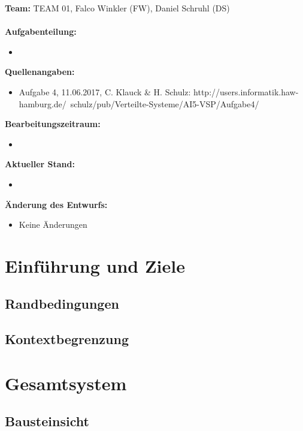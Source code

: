 \documentclass{article}
\begin{document}
\textbf{Team:} TEAM 01, Falco Winkler (FW), Daniel Schruhl (DS)\\
\\
\textbf{Aufgabenteilung:}
\begin{itemize}
    \item
\end{itemize}

\textbf{Quellenangaben:}
\begin{itemize}
    \item Aufgabe 4, 11.06.2017, C. Klauck \& H. Schulz: \newline
    http://users.informatik.haw-hamburg.de/~schulz/pub/Verteilte-Systeme/AI5-VSP/Aufgabe4/
\end{itemize}

\textbf{Bearbeitungszeitraum:}
\begin{itemize}
	\item
\end{itemize}

\textbf{Aktueller Stand:}
\begin{itemize}
	\item
\end{itemize}

\textbf{Änderung des Entwurfs:}
\begin{itemize}
    \item Keine Änderungen
\end{itemize}

\newpage

\section{Einführung und Ziele}

\subsection{Randbedingungen}

\subsection{Kontextbegrenzung}

\newpage

\section{Gesamtsystem}

\subsection{Bausteinsicht}
\end{document}
